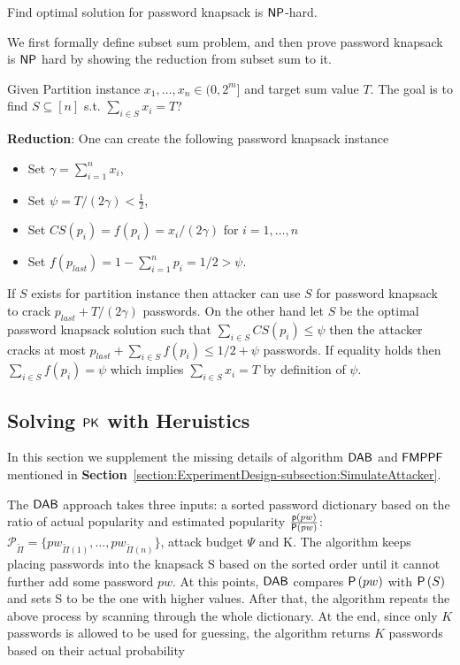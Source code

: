 \begin{theorem}\label{appendix:ProofOfPasswordKnapsack}
	Find optimal solution for password knapsack is $\mathsf{NP}$-hard.
\end{theorem}

We first formally define subset sum problem, and then prove password knapsack is $\mathsf{NP}$ hard by showing the reduction from subset sum to it.
\begin{definition}
	Given Partition instance $x_1,\ldots,x_{n} \in (0,2^m]$ and target sum value $T$. The goal is to find $S \subseteq [n]$ s.t. $\sum_{i\in S} x_i = T$? 
\end{definition}
\textbf{Reduction}: One can create the following password knapsack instance 
\begin{itemize}
	\item Set $\gamma = \sum_{i=1}^n x_i$,
	\item Set $\psi = T/(2\gamma )< \frac{1}{2}$,
	\item Set $CS(p_i)= f(p_{i}) = x_i/(2\gamma)$ for $i=1,\ldots, n$
	\item Set $f(p_{last}) = 1-\sum_{i =1}^{n} p_i = 1/2 > \psi$. 
\end{itemize}
If $S$ exists for partition instance then attacker can use $S$ for password knapsack to crack $p_{last}+T/(2\gamma)$ passwords. On the other hand let $S$ be the optimal password knapsack solution such that $\sum_{i \in S} CS(p_i) \leq \psi$ then the attacker cracks at most $p_{last}+\sum_{i \in S} f(p_i) \leq 1/2 + \psi$ passwords. If equality holds then $\sum_{i \in S} f(p_i) = \psi$ which implies $\sum_{i \in S} x_i = T$ by definition of $\psi$.





\subsection{Solving $\mathsf{PK}$ with Heruistics}
In this section we supplement the missing details of algorithm $\mathsf{DAB}$ and $\mathsf{FMPPF}$ mentioned in \textbf{Section}~\ref{section:ExperimentDesign-subsection:SimulateAttacker}.  

The $\mathsf{DAB}$ approach takes three inputs: a sorted password dictionary based on the ratio of actual popularity and estimated popularity $\frac{\textsf{p}(pw)}{\mathsf{P}\left(pw\right)}$: $\mathcal{P}_{\tilde{\Pi}} = \{pw_{\tilde{\Pi}(1)}, \ldots, pw_{\tilde{\Pi}(n)} \}$, attack budget $\Psi$ and K. The algorithm keeps placing passwords into the knapsack S based on the sorted order until it cannot further add some password $pw$. At this points, $\mathsf{DAB}$ compares $\mathsf{P}\left(pw\right)$ with $\mathsf{P}\left(S\right)$ and sets S to be the one with higher values. After that, the algorithm repeats the above process by scanning through the whole dictionary. At the end, since only $K$ passwords is allowed to be used for guessing, the algorithm returns $K$ passwords based on their actual probability


